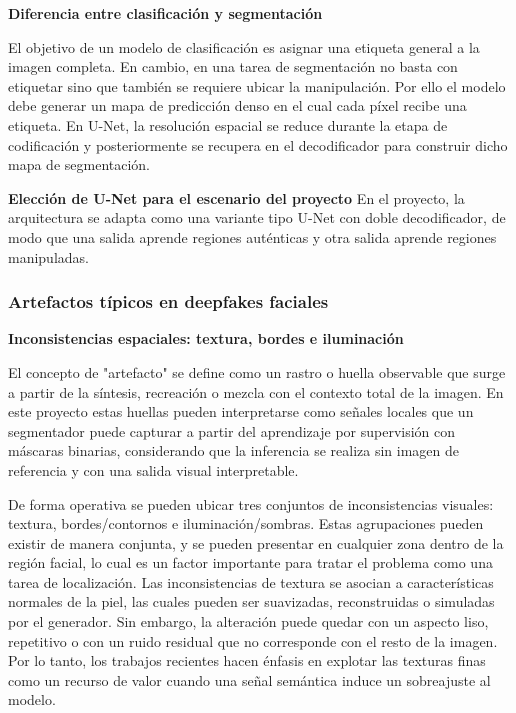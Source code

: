 \medskip\textbf{Diferencia entre clasificación y segmentación}

El objetivo de un modelo de clasificación es asignar una etiqueta general a la imagen completa. En cambio, en una tarea de segmentación no basta con etiquetar sino que también se requiere ubicar la manipulación. Por ello el modelo debe generar un mapa de predicción denso en el cual cada píxel recibe una etiqueta. En U-Net, la resolución espacial se reduce durante la etapa de codificación y posteriormente se recupera en el decodificador para construir dicho mapa de segmentación.

\medskip\textbf{Elección de U-Net para el escenario del proyecto}
En el proyecto, la arquitectura se adapta como una variante tipo U-Net con doble decodificador, de modo que una salida aprende regiones auténticas y otra salida aprende regiones manipuladas\parencite{Ronneberger2015}.

\subsubsection{Artefactos típicos en deepfakes faciales}

\medskip\textbf{Inconsistencias espaciales: textura, bordes e iluminación}

El concepto de "artefacto" se define como un rastro o huella observable que surge a partir de la síntesis, recreación o mezcla con el contexto total de la imagen\parencite{Amerini2025, MurguiaSerranoJY2025}. En este proyecto estas huellas pueden interpretarse como señales locales que un segmentador puede capturar a partir del aprendizaje por supervisión con máscaras binarias, considerando que la inferencia se realiza sin imagen de referencia y con una salida visual interpretable. 

De forma operativa se pueden ubicar tres conjuntos de inconsistencias visuales: textura, bordes/contornos e iluminación/sombras. Estas agrupaciones pueden existir de manera conjunta, y se pueden presentar en cualquier zona dentro de la región facial, lo cual es un factor importante para tratar el problema como una tarea de localización.
Las inconsistencias de textura se asocian a características normales de la piel, las cuales pueden ser suavizadas, reconstruidas o simuladas por el generador. Sin embargo, la alteración puede quedar con un aspecto liso, repetitivo o con un ruido residual que no corresponde con el resto de la imagen. Por lo tanto, los trabajos recientes hacen énfasis en explotar las texturas finas como un recurso de valor cuando una señal semántica induce un sobreajuste al modelo\parencite{Jiang2025, Jin2025}.

